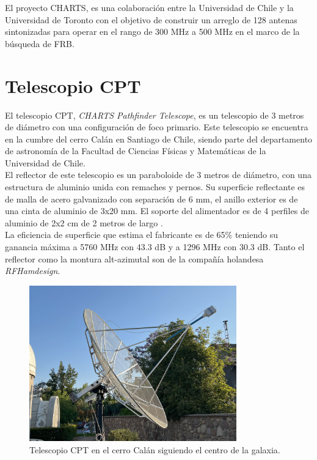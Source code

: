 El proyecto CHARTS, es una colaboración entre la Universidad de Chile y la Universidad de Toronto con el objetivo de construir un arreglo de 128 antenas sintonizadas para operar en el rango de 300 MHz a 500 MHz en el marco de la búsqueda de FRB.\\


\section{Telescopio CPT}

El telescopio CPT, \textit{CHARTS Pathfinder Telescope}, es un telescopio de 3 metros de diámetro con una configuración de foco primario. Este telescopio se encuentra en la cumbre del cerro Calán en Santiago de Chile, siendo parte del departamento de astronomía de la Facultad de Ciencias Físicas y Matemáticas de la Universidad de Chile.\\

El reflector de este telescopio es un paraboloide de 3 metros de diámetro, con una estructura de aluminio unida con remaches y pernos. Su superficie reflectante es de malla de acero galvanizado con separación de 6 mm, el anillo exterior es de una cinta de aluminio de 3x20 mm. El soporte del alimentador es de 4 perfiles de aluminio de 2x2 cm de 2 metros de largo \cite{rfhamdesign3meterdish}.\\

La eficiencia de superficie que estima el fabricante es de 65\% teniendo su ganancia máxima a 5760 MHz con 43.3 dB y a 1296 MHz con 30.3 dB. Tanto el reflector como la montura alt-azimutal son de la compañía holandesa \textit{RFHamdesign}.\\

\begin{figure}
    \centering
    \includegraphics[width = 0.8\textwidth]{img/cpt_tracking}
    \caption{Telescopio CPT en el cerro Calán siguiendo el centro de la galaxia.}
    \label{fig:cpt}
\end{figure}

